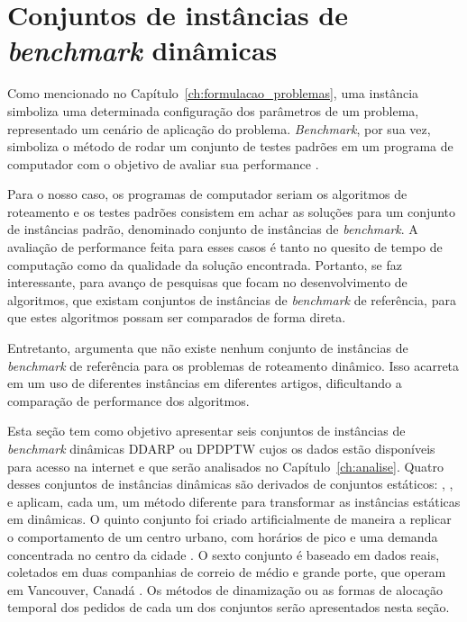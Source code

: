 \chapter{Conjuntos de instâncias de \textit{benchmark} dinâmicas}
\label{ch:instancias}
Como mencionado no Capítulo~\ref{ch:formulacao_problemas}, uma instância
simboliza uma determinada configuração dos parâmetros de um problema,
representado um cenário de aplicação do problema.
\textit{Benchmark}, por sua vez, simboliza o método de rodar um conjunto de
testes padrões em um programa de computador com o objetivo de avaliar sua
performance \cite{fleming_how_1986}.

Para o nosso caso, os programas de computador seriam os algoritmos de
roteamento e os testes padrões consistem em achar as soluções para um conjunto 
de instâncias padrão, denominado conjunto de instâncias de \textit{benchmark}.
A avaliação de performance feita para esses casos é tanto no quesito de tempo
de computação como da qualidade da solução encontrada.
Portanto, se faz interessante, para avanço de pesquisas que focam no
desenvolvimento de algoritmos,  que existam conjuntos de instâncias de
\textit{benchmark} de referência, para que estes algoritmos possam ser
comparados de forma direta.

Entretanto, \textcite{pillac_review_2013} argumenta que não existe nenhum
conjunto de instâncias de \textit{benchmark} de referência para os problemas 
de roteamento dinâmico.
Isso acarreta em um uso de diferentes instâncias em diferentes artigos,
dificultando a comparação de performance dos algoritmos.

Esta seção tem como objetivo apresentar seis conjuntos de instâncias de 
\textit{benchmark} dinâmicas DDARP ou DPDPTW cujos os dados estão disponíveis 
para acesso na internet \cite{pankratz_benchmark_2009} e que
serão analisados no Capítulo~\ref{ch:analise}.
Quatro desses conjuntos de instâncias dinâmicas são derivados de conjuntos 
estáticos: 
\textcite{berbeglia_hybrid_tabu_2012},
\textcite{pureza_laporte_waiting_2008}, 
\textcite{pankratz_dynamic_2005}
e \textcite{fabri_dynamic_2006}
aplicam, cada um, um método diferente para transformar as
instâncias estáticas em dinâmicas.
O quinto conjunto foi criado artificialmente de maneira a replicar o
comportamento de um centro urbano, com horários de pico e uma demanda 
concentrada no centro da cidade \cite{gendreau_neighborhood_2006}.
O sexto conjunto é baseado em dados reais, coletados em duas companhias 
de correio de médio e grande porte, que operam em Vancouver, Canadá 
\cite{mitrovic-minic_waiting_2004}.
Os métodos de dinamização ou as formas de alocação temporal dos pedidos de cada 
um dos conjuntos serão apresentados nesta seção.

